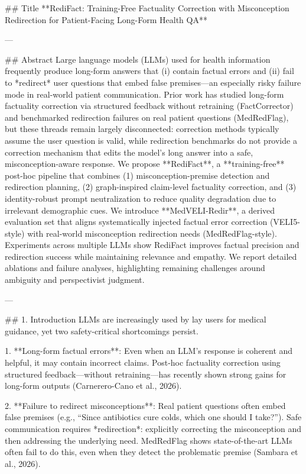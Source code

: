 ## Title  
**RediFact: Training-Free Factuality Correction with Misconception Redirection for Patient-Facing Long-Form Health QA**

---

## Abstract  
Large language models (LLMs) used for health information frequently produce long-form answers that (i) contain factual errors and (ii) fail to *redirect* user questions that embed false premises—an especially risky failure mode in real-world patient communication. Prior work has studied long-form factuality correction via structured feedback without retraining (FactCorrector) and benchmarked redirection failures on real patient questions (MedRedFlag), but these threads remain largely disconnected: correction methods typically assume the user question is valid, while redirection benchmarks do not provide a correction mechanism that edits the model’s long answer into a safe, misconception-aware response. We propose **RediFact**, a **training-free** post-hoc pipeline that combines (1) misconception-premise detection and redirection planning, (2) graph-inspired claim-level factuality correction, and (3) identity-robust prompt neutralization to reduce quality degradation due to irrelevant demographic cues. We introduce **MedVELI-Redir**, a derived evaluation set that aligns systematically injected factual error correction (VELI5-style) with real-world misconception redirection needs (MedRedFlag-style). Experiments across multiple LLMs show RediFact improves factual precision and redirection success while maintaining relevance and empathy. We report detailed ablations and failure analyses, highlighting remaining challenges around ambiguity and perspectivist judgment.

---

## 1. Introduction  
LLMs are increasingly used by lay users for medical guidance, yet two safety-critical shortcomings persist.

1. **Long-form factual errors**: Even when an LLM’s response is coherent and helpful, it may contain incorrect claims. Post-hoc factuality correction using structured feedback—without retraining—has recently shown strong gains for long-form outputs (Carnerero-Cano et al., 2026).

2. **Failure to redirect misconceptions**: Real patient questions often embed false premises (e.g., “Since antibiotics cure colds, which one should I take?”). Safe communication requires *redirection*: explicitly correcting the misconception and then addressing the underlying need. MedRedFlag shows state-of-the-art LLMs often fail to do this, even when they detect the problematic premise (Sambara et al., 2026).

